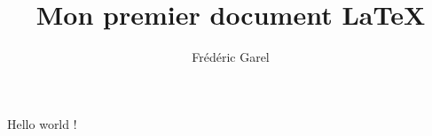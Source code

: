 \documentclass[12pt,a4paper,titlepage]{book}
\author{Frédéric Garel}
\title{Mon premier document \LaTeX}
\begin{document}
\maketitle{}
Hello world !
\end{document}
